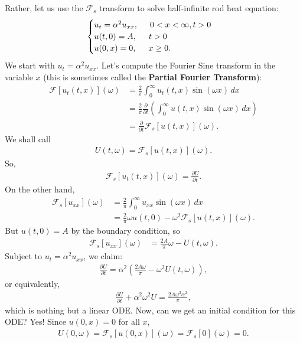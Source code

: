 \documentclass{article}
\theoremstyle{definition}
\newcommand{\p}{\partial}
\newcommand{\F}{\mathcal{F}}
\begin{document}
Rather, let us use the $\F_s$ transform to solve half-infinite rod heat equation:
\begin{align*}
\begin{cases}
u_t = \alpha^2 u_{xx}, \hspace{0.5cm}0 < x < \infty, t> 0\\
u(t,0) = A, \hspace{0.5cm} t> 0\\
u(0,x) = 0, \hspace{0.5cm} x\geq 0.
\end{cases}
\end{align*}
We start with $u_t = \alpha^2 u_{xx}$. Let's compute the Fourier Sine transform in the variable $x$ (this is sometimes called the \textbf{Partial Fourier Transform}):
\begin{align*}
\F[u_t(t,x)](\omega) &= \frac{2}{\pi}\int^\infty_0 u_t(t,x)\sin(\omega x)\,dx\\
&= \frac{2}{\pi}\frac{\p}{\p t}\left(\int^\infty_0 u(t,x)\sin(\omega x)\,dx  \right)\\
&= \frac{\p}{\p t}\F_s[u(t,x)](\omega).
\end{align*}
We shall call
\begin{align*}
U(t,\omega) = \F_s[u(t,x)](\omega).
\end{align*}
So,
\begin{align*}
\F_s[u_t(t,x)](\omega) = \frac{\p U}{\p t}.
\end{align*}
On the other hand,
\begin{align*}
\F_s[u_{xx}](\omega) &= \frac{2}{\pi}\int^\infty_0 u_{xx}\sin(\omega x)\,dx\\
&= \frac{2}{\pi}\omega u(t,0) - \omega^2 \F_s[u(t,x)](\omega).
\end{align*}
But $u(t,0) = A$ by the boundary condition, so
\begin{align*}
\F_s[u_{xx}](\omega) &= \frac{2A}{\pi}\omega - U(t,\omega).
\end{align*}
Subject to $u_t = \alpha^2 u_{xx}$, we claim:
\begin{align*}
\frac{\p U}{\p t} = \alpha^2\left( \frac{2A\omega}{\pi} - \omega^2U(t,\omega) \right),
\end{align*}
or equivalently,
\begin{align*}
\frac{\p U}{\p t} + \alpha^2\omega^2 U = \frac{2A\omega^2\alpha^2}{\pi}, 
\end{align*}
which is nothing but a linear ODE. Now, can we get an initial condition for this ODE? Yes! Since $u(0,x) = 0$ for all $x$,
\begin{align*}
U(0, \omega) = \F_s[u(0,x)](\omega) = \F_s[0](\omega) = 0.
\end{align*}
\end{document}
